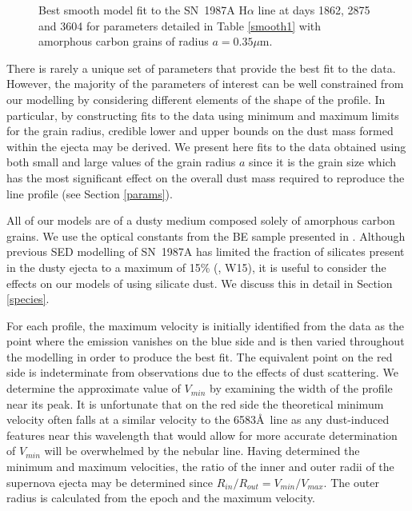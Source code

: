 \documentclass[useAMS,usenatbib,usegraphicx]{mnras}
\begin{document}
\begin{figure}
\begin{center}
\caption{Best smooth model fit to the SN~1987A H$\alpha$ line at days 1862, 2875 and 
3604 for parameters detailed in Table \ref{smooth1} with amorphous carbon grains of radius $a=0.35 \mu$m.}
\label{d1862_3604}
\end{center}
\end{figure}


There is rarely a unique set of parameters that provide the best fit to the data.  However, the 
majority of the parameters of interest can be well constrained from our 
modelling by considering different elements of the shape of the profile.  In particular, by constructing fits to 
the data using minimum and maximum limits for the grain 
radius, credible lower and upper bounds on the  dust mass formed 
within the ejecta may be derived.  We present here
 fits to the data obtained using both small and large values of the grain radius $a$ since it is the grain size which has the most significant effect on the overall 
dust mass required to reproduce the line profile (see Section \ref{params}).  

All of our models are of a dusty medium composed solely of amorphous carbon grains. We use the optical 
constants from the BE sample presented in \citet{Zubko1996}.    Although previous SED modelling of SN~1987A has limited the fraction of silicates present in the dusty ejecta to a maximum of 15\% (\citet{Ercolano2007}, W15), it is useful to consider the effects on our models of using silicate dust.  We discuss this in detail in Section \ref{species}.

For each profile, the maximum velocity is initially identified from the data as the 
point where the emission vanishes on the blue side and is then varied throughout the modelling in order to produce the best fit.  The equivalent point on 
the red side is indeterminate from observations due to the effects of 
dust scattering.  We determine the approximate value of $V_{min}$ by examining the width of the profile near its peak. It is unfortunate that on the red side the theoretical minimum velocity often falls at 
a similar velocity to the 6583\AA\ line as any dust-induced features near this wavelength that would allow for more accurate determination of $V_{min}$
 will be overwhelmed by the nebular line.  Having determined the minimum and maximum velocities, the ratio 
of the inner and outer radii of the supernova ejecta may be determined since 
$R_{in}/R_{out}=V_{min}/V_{max}$.  The outer radius is calculated from the 
epoch and the maximum velocity.
\end{document}
